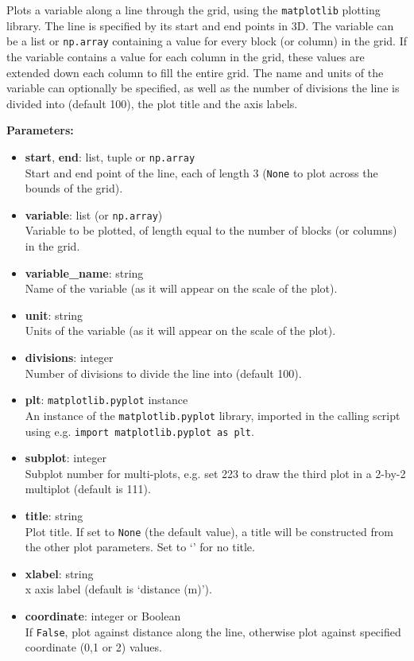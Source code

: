 Plots a variable along a line through the grid, using the \texttt{matplotlib} plotting library. The line is specified by its start and end points in 3D.  The variable can be a list or \texttt{np.array} containing a value for every block (or column) in the grid.  If the variable contains a value for each column in the grid, these values are extended down each column to fill the entire grid.  The name and units of the variable can optionally be specified, as well as the number of divisions the line is divided into (default 100), the plot title and the axis labels.

\textbf{Parameters:}
\begin{itemize}
\item \textbf{start}, \textbf{end}: list, tuple or \texttt{np.array}\\
  Start and end point of the line, each of length 3 (\texttt{None} to plot across the bounds of the grid).
\item \textbf{variable}: list (or \texttt{np.array})\\
  Variable to be plotted, of length equal to the number of blocks (or columns) in the grid.
\item \textbf{variable\_name}: string\\
  Name of the variable (as it will appear on the scale of the plot).
\item \textbf{unit}: string\\
  Units of the variable (as it will appear on the scale of the plot).
\item \textbf{divisions}: integer\\
  Number of divisions to divide the line into (default 100).
\item \textbf{plt}: \texttt{matplotlib.pyplot} instance\\
  An instance of the \texttt{matplotlib.pyplot} library, imported in the calling script using e.g. \texttt{import matplotlib.pyplot as plt}.
\item \textbf{subplot}: integer\\
  Subplot number for multi-plots, e.g. set 223 to draw the third plot in a 2-by-2 multiplot (default is 111).
\item \textbf{title}: string\\
  Plot title.  If set to \texttt{None} (the default value), a title will be constructed from the other plot parameters.  Set to `' for no title.
\item \textbf{xlabel}: string\\
  x axis label (default is `distance (m)').
\item \textbf{coordinate}: integer or Boolean\\
  If \texttt{False}, plot against distance along the line, otherwise plot against specified coordinate (0,1 or 2) values.
\end{itemize}

